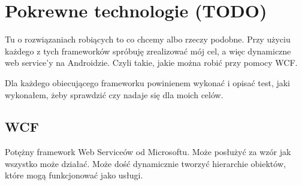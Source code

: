 \chapter{Pokrewne technologie (TODO)}
Tu o rozwiązaniach robiących to co chcemy albo rzeczy podobne. Przy użyciu każdego z tych frameworków spróbuję zrealizować mój cel, a więc dynamiczne web service'y na Androidzie. Czyli takie, jakie można robić przy pomocy WCF.

Dla każdego obiecującego frameworku powinienem wykonać i opisać test, jaki wykonałem, żeby sprawdzić czy nadaje się dla moich celów.

%
%
%
%

\section{WCF}
Potężny framework Web Serviceów od Microsoftu. Może posłużyć za wzór jak wszystko może działać. Może dość dynamicznie tworzyć hierarchie obiektów, które mogą funkcjonować jako usługi.


